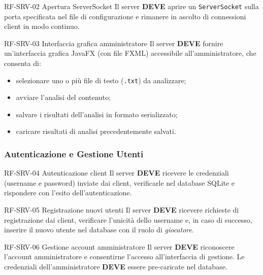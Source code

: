 \documentclass[12pt, a4paper]{article}
\newcommand{\mustshall}{\textbf{DEVE}}
\newcommand{\code}[1]{\texttt{#1}}
\begin{document}
\begin{reqbox}{RF-SRV-02 \quad Apertura ServerSocket \quad [MUST]}
Il server \mustshall{} aprire un \code{ServerSocket} sulla porta specificata nel file di configurazione e rimanere in ascolto di connessioni client in modo continuo.
\end{reqbox}

\begin{reqbox}{RF-SRV-03 \quad Interfaccia grafica amministratore \quad [MUST]}
Il server \mustshall{} fornire un'interfaccia grafica JavaFX (con file FXML) accessibile all'amministratore, che consenta di:
\begin{itemize}
    \item selezionare uno o più file di testo (\code{.txt}) da analizzare;
    \item avviare l'analisi del contenuto;
    \item salvare i risultati dell'analisi in formato serializzato;
    \item caricare risultati di analisi precedentemente salvati.
\end{itemize}
\end{reqbox}

\subsubsection{Autenticazione e Gestione Utenti}

\begin{reqbox}{RF-SRV-04 \quad Autenticazione client \quad [MUST]}
Il server \mustshall{} ricevere le credenziali (username e password) inviate dai client, verificarle nel database SQLite e rispondere con l'esito dell'autenticazione.
\end{reqbox}

\begin{reqbox}{RF-SRV-05 \quad Registrazione nuovi utenti \quad [MUST]}
Il server \mustshall{} ricevere richieste di registrazione dai client, verificare l'unicità dello username e, in caso di successo, inserire il nuovo utente nel database con il ruolo di \textit{giocatore}.
\end{reqbox}

\begin{reqbox}{RF-SRV-06 \quad Gestione account amministratore \quad [MUST]}
Il server \mustshall{} riconoscere l'account amministratore e consentirne l'accesso all'interfaccia di gestione. Le credenziali dell'amministratore \mustshall{} essere pre-caricate nel database.
\end{reqbox}
\end{document}
